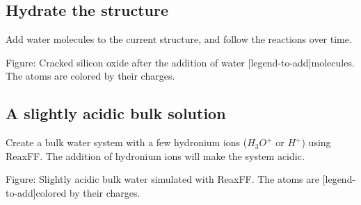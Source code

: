 \subsection{Hydrate the structure}
\noindent Add water molecules to the current structure, and follow the reactions over
time.

\vspace{0.25cm} Figure: Cracked silicon oxide after the addition of water
[legend-to-add]molecules. The atoms are colored by their charges.

\subsection{A slightly acidic bulk solution}
\noindent Create a bulk water system with a few hydronium ions ($H_3O^+$
or $H^+$) using ReaxFF. The addition of hydronium ions will make the
system acidic.

\vspace{0.25cm} Figure: Slightly acidic bulk water simulated with ReaxFF. The atoms are
[legend-to-add]colored by their charges.

